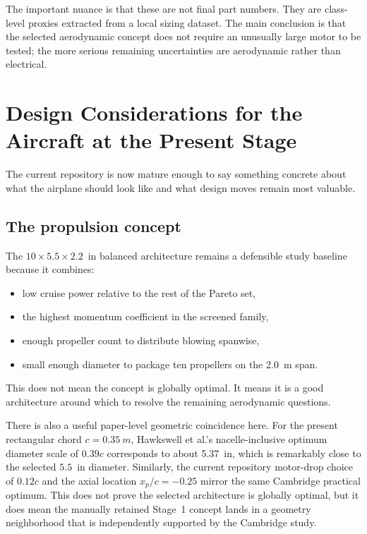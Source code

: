 \documentclass[conf]{new-aiaa}
\begin{document}
The important nuance is that these are not final part numbers. They are class-level proxies extracted from a local sizing dataset. The main conclusion is that the selected aerodynamic concept does not require an unusually large motor to be tested; the more serious remaining uncertainties are aerodynamic rather than electrical.

\section{Design Considerations for the Aircraft at the Present Stage}

The current repository is now mature enough to say something concrete about what the airplane should look like and what design moves remain most valuable.

\subsection{The propulsion concept}

The \(10\times 5.5\times 2.2\)~in balanced architecture remains a defensible study baseline because it combines:
\begin{itemize}
\item low cruise power relative to the rest of the Pareto set,
\item the highest momentum coefficient in the screened family,
\item enough propeller count to distribute blowing spanwise,
\item small enough diameter to package ten propellers on the \SI{2.0}{m} span.
\end{itemize}
This does not mean the concept is globally optimal. It means it is a good architecture around which to resolve the remaining aerodynamic questions.

There is also a useful paper-level geometric coincidence here. For the present rectangular chord \(c=\SI{0.35}{m}\), Hawkswell et al.'s nacelle-inclusive optimum diameter scale of \(0.39c\) corresponds to about \SI{5.37}{in}, which is remarkably close to the selected \(5.5\)~in diameter.\cite{Hawkswell2022} Similarly, the current repository motor-drop choice of \(0.12c\) and the axial location \(x_p/c=-0.25\) mirror the same Cambridge practical optimum. This does not prove the selected architecture is globally optimal, but it does mean the manually retained Stage~1 concept lands in a geometry neighborhood that is independently supported by the Cambridge study.
\end{document}
